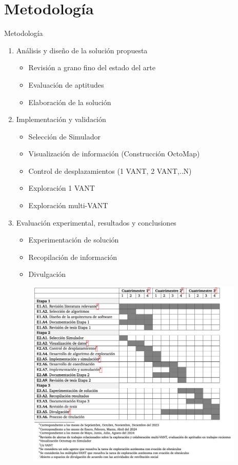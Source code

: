 \documentclass[
	11pt, %
	aspectratio=169, %
]{beamer}
\begin{document}
\section{Metodología}
\begin{frame}{Metodología}

  \begin{enumerate}
  \item <1-> Análisis y diseño de la solución propuesta 
    \begin{itemize}
    \item Revisión a grano fino del estado del arte
    \item Evaluación de aptitudes
    \item Elaboración de la solución
    \end{itemize}
  \item <2-> Implementación y validación
    \begin{itemize}
    \item Selección de Simulador
    \item Visualización de información (Construcción OctoMap)
    \item Control de desplazamientos (1 VANT, 2 VANT,..N)
    \item Exploración 1 VANT
    \item Exploración multi-VANT
    \end{itemize}
  \item <3-> Evaluación experimental, resultados y conclusiones
    \begin{itemize}
    \item Experimentación de solución
    \item Recopilación de información
    \item Divulgación
    \end{itemize}
  \end{enumerate}  
\end{frame}

\begin{frame}
  \begin{figure}
    \centering
    \includegraphics[width=12cm, height=9cm]{cronograma}
  \end{figure}
\end{frame}
\end{document}
